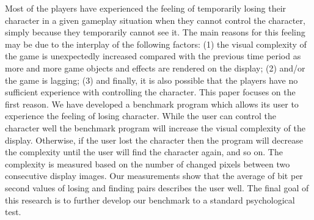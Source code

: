 Most of the players have experienced the feeling of temporarily losing their character in a given gameplay situation when they cannot control the character, simply because they temporarily cannot see it. The main reasons for this feeling may be due to the interplay of the following factors: (1) the visual complexity of the game is unexpectedly increased compared with the previous time period as more and more game objects and effects 
are rendered on the display; (2) and/or the game is lagging; (3) and finally, it is also possible that the players have no sufficient experience with controlling the character. This paper focuses on the first reason. We have developed a benchmark program 
which allows its user to experience the feeling of losing character. While the user can control the character well the benchmark program will increase the visual complexity of the display. Otherwise, if the user lost the character then the program will decrease the complexity until the user will find the character again, and so on. The complexity is measured based on the number of changed pixels between two consecutive display images. Our measurements show that the average of bit per second values of losing and finding pairs describes the user well. 
The final goal of this research is to further develop our benchmark to a standard psychological test.